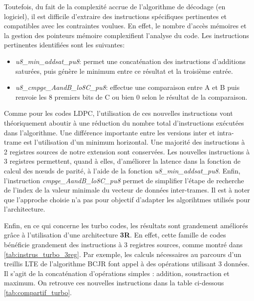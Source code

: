 \documentclass[../main.tex]{subfiles}
\begin{document}
Toutefois, du fait de la complexité accrue de l'algorithme de décodage (en logiciel), il est difficile d'extraire des instructions spécifiques pertinentes et compatibles avec les contraintes voulues. 
En effet, le nombre d'accès mémoires et la gestion des pointeurs mémoire complexifient l'analyse du code.
Les instructions pertinentes identifiées sont les suivantes: 
\begin{itemize}
    \item \textit{u8\_min\_addsat\_pu8}: permet une concaténation des instructions d'additions saturées, puis génère le minimum entre ce résultat et la troisième entrée.
    \item \textit{u8\_cmpge\_AandB\_lo8C\_pu8}: effectue une comparaison entre A et B puis renvoie les 8 premiers bits de C ou bien 0 selon le résultat de la comparaison. 
\end{itemize}
Comme pour les codes LDPC, l'utilisation de ces nouvelles instructions vont théoriquement aboutir à une réduction du nombre total d'instructions exécutées dans l'algorithme.
Une différence importante entre les versions inter et intra-trame est l'utilisation d'un minimum horizontal.
Une majorité des instructions à 2 registres sources de notre extension sont conservées.
Les nouvelles instructions à 3 registres permettent, quand à elles, d'améliorer la latence dans la fonction de calcul des nœuds de parité, à l'aide de la fonction \textit{u8\_min\_addsat\_pu8}.
Enfin, l'instruction \textit{cmpge\_AandB\_lo8C\_pu8} permet de simplifier l'étape de recherche de l'index de la valeur minimale du vecteur de données inter-trames. Il est à noter que l'approche choisie n'a pas pour objectif d'adapter les algorihtmes utilisés pour l'architecture. 



Enfin, en ce qui concerne les turbo codes, les résultats sont grandement améliorés grâce à l'utilisation d'une architecture \textbf{3R}.
En effet, cette famille de codes bénéficie grandement des instructions à 3 registres sources, comme montré dans \ref{tab:instrus_turbo_3reg}.
Par exemple, les calculs nécessaires au parcours d'un treillis LTE de l'algorithme BCJR font appel à des opérations utilisant 3 données.
Il s'agit de la concaténation d'opérations simples : addition, soustraction et maximum.
On retrouve ces nouvelles instructions dans la table ci-dessous \ref{tab:compartif_turbo}.
\end{document}
